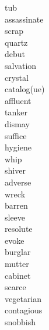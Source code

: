 \documentclass[b5paper, 11pt]{ctexart}
\begin{document}
\begin{multicols*}{3}
\begin{description}
\item[tub]

\item[assassinate]

\item[scrap]

\item[quartz]

\item[debut]

\item[salvation]

\item[crystal]

\item[catalog(ue)]

\item[affluent]

\item[tanker]

\item[dismay]

\item[suffice]

\item[hygiene]

\item[whip]

\item[shiver]

\item[adverse]

\item[wreck]

\item[barren]

\item[sleeve]

\item[resolute]

\item[evoke]

\item[burglar]

\item[mutter]

\item[cabinet]

\item[scarce]

\item[vegetarian]

\item[contagious]

\item[snobbish]


\end{description}
\end{multicols*}
\end{document}
